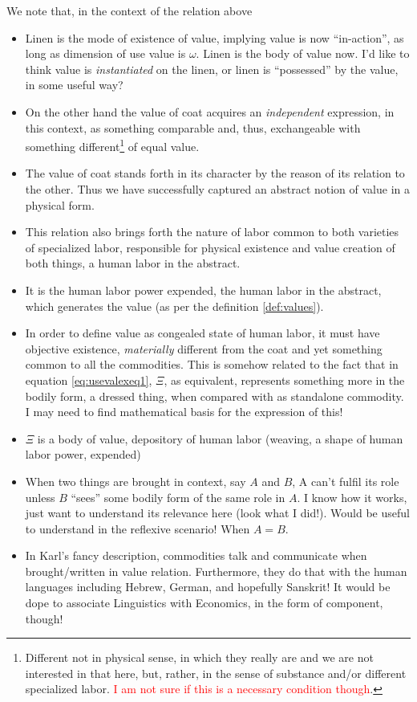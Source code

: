 \documentclass[12pt]{extarticle}
\theoremstyle{definition}
\newenvironment{remark}[1][Remark]{\begin{trivlist}
\item[\hskip \labelsep {\bfseries #1}]}{\end{trivlist}}
\begin{document}
\begin{remark}
  We note that, in the context of the relation above
  \begin{itemize}
  \item Linen is the mode of existence of value, implying value is now ``in-action'', as long as dimension of use value is $\omega$.  Linen is the body of value now.  I'd like to think value is \emph{instantiated} on the linen, or linen is ``possessed'' by the value, in some useful way?
  \item On the other hand the value of coat acquires an \emph{independent} expression, in this context, as something comparable and, thus, exchangeable with something different\footnote{Different not in physical sense, in which they really are and we are not interested in that here, but, rather, in the sense of substance and/or different specialized labor.  \textcolor{red}{I am not sure if this is a necessary condition though}.} of equal value.
  \item The value of coat stands forth in its character by the reason of its relation to the other.  Thus we have successfully captured an abstract notion of value in a physical form.
  \item This relation also brings forth the nature of labor common to both varieties of specialized labor, responsible for physical existence and value creation of both things, a human labor in the abstract.
    \item It is the human labor power expended, the human labor in the abstract, which generates the value (as per the definition \ref{def:values}).
    \item In order to define value as congealed state of human labor, it must have objective existence, \emph{materially} different from the coat and yet something common to all the commodities.  This is somehow related to the fact that in equation \ref{eq:usevalexeq1}, $\Xi$, as equivalent, represents something more in the bodily form, a dressed thing, when compared with as standalone commodity.  I may need to find mathematical basis for the expression of this!
    \item $\Xi$ is a body of value, depository of human labor (weaving, a shape of human labor power, expended)
    \item When two things are brought in context, say $A$ and $B$, A can't fulfil its role unless $B$ ``sees'' some bodily form of the same role in $A$.  I know how it works, just want to understand its relevance here (look what I did!).  Would be useful to understand in the reflexive scenario!  When $A=B$.
      \item In Karl's fancy description, commodities talk and communicate when brought/written in value relation.  Furthermore, they do that with the human languages including Hebrew, German, and hopefully Sanskrit!  It would be dope to associate Linguistics with Economics, in the form of component, though!
  \end{itemize}
\end{remark}
\end{document}
